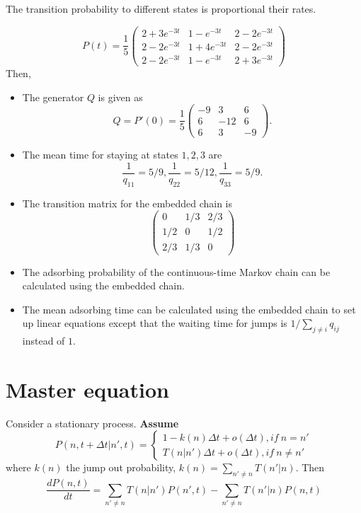 \begin{refsection}
\begin{remark}
The transition probability to different states is proportional their rates. 
\end{remark}

\begin{example}
	$$P(t) = \frac{1}{5}\begin{pmatrix}
	2+3e^{-3t} & 1-e^{-3t} & 2-2e^{-3t}\\ 
2-2e^{-3t} & 1+4e^{-3t} &2-2e^{-3t} \\ 
2-2e^{-3t} & 1-e^{-3t} & 2+3e^{-3t}
\end{pmatrix}$$
Then,
\begin{itemize}
	\item The generator $Q$ is given as
	$$Q = P'(0) = \frac{1}{5}\begin{pmatrix}
	-9 & 3 & 6\\ 
	6 & -12 & 6\\ 
	6 & 3 & -9
	\end{pmatrix}.$$
	\item The mean time for staying at states $1,2,3$ are
	$$\frac{1}{q_{11}} = 5/9,\frac{1}{q_{22}} = 5/12,\frac{1}{q_{33}} = 5/9.$$
	\item The transition matrix for the embedded chain is
	$$\begin{pmatrix}
	0 & 1/3 & 2/3\\ 
	1/2 & 0 & 1/2\\ 
	2/3 & 1/3 & 0
	\end{pmatrix}$$
\end{itemize}

\end{example}



\begin{remark}\cite[200]{privault2013understanding}
\begin{itemize}
	\item The adsorbing probability of the continuous-time Markov chain can be calculated using the embedded chain. 
	\item The mean adsorbing time can be calculated using the embedded chain to set up linear equations except that the waiting time for jumps is $1/\sum_{j\neq i}q_{ij}$ instead of $1$. 
\end{itemize}
\end{remark}

\section{Master equation}
\begin{definition}
	Consider a stationary process. \textbf{Assume} 
	$$P(n,t+\Delta t|n',t) = \begin{cases}
	1 - k(n)\Delta t + o(\Delta t), if ~ n=n'\\
	T(n|n')\Delta t + o(\Delta t), if ~ n\neq n'
	\end{cases}$$
	where $k(n)$ the jump out probability, $k(n) = \sum_{n'\neq n}T(n'|n)$. Then
	$$\frac{dP(n,t)}{dt} = \sum_{n'\neq n}T(n|n')P(n',t) - \sum_{n'\neq n} T(n'|n) P(n,t)$$
\end{definition}



\end{refsection}
